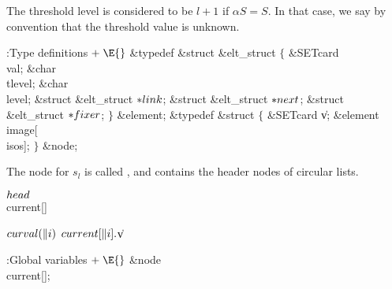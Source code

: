 The threshold level is considered to be $l+1$ if $\alpha S=S$. In that
case, we say by convention that the threshold value is unknown.

\Y\B\4:Type definitions\X${}\mathrel+\E{}$\6
\&{typedef} \&{struct} \&{elt\_struct} ${}\{{}$\1\6
\&{SETcard} \\{val};\6
\&{char} \\{tlevel};\6
\&{char} \\{level};\6
\&{struct} \&{elt\_struct} ${}{*}\\{link}{}$;%
\6
\&{struct} \&{elt\_struct} ${}{*}\\{next}{}$;\6
\&{struct} \&{elt\_struct} ${}{*}\\{fixer}{}$;\2\6
${}\}{}$ \&{element};\7
\&{typedef} \&{struct} ${}\{{}$\1\6
\&{SETcard} \|v;\6
\&{element} \\{image}[\\{isos}];\2\6
${}\}{}$ \&{node};\par
\fi

The node for $s_l$ is called , and %
 contains
the header nodes of circular lists.

\Y\B\4\D$\\{head}$ \5
\\{current}[]\par
\B\4\D$\\{curval}(\|i)$ \5
$\\{current}[\|i].{}$\|v\par
\Y\B\4:Global variables\X${}\mathrel+\E{}$\6
\&{node} \\{current}[];\par
\fi

